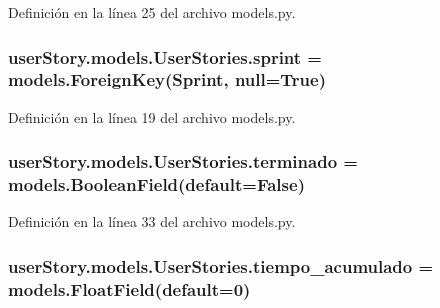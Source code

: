 Definición en la línea 25 del archivo models.\+py.

\subsubsection[{\texorpdfstring{sprint}{sprint}}]{\setlength{\rightskip}{0pt plus 5cm}user\+Story.\+models.\+User\+Stories.\+sprint = models.\+Foreign\+Key({\bf Sprint}, null=True)\hspace{0.3cm}{\ttfamily [static]}}\hypertarget{classuser_story_1_1models_1_1_user_stories_ab0c43b69bb58a9813846b1ea586a0789}{}\label{classuser_story_1_1models_1_1_user_stories_ab0c43b69bb58a9813846b1ea586a0789}


Definición en la línea 19 del archivo models.\+py.

\subsubsection[{\texorpdfstring{terminado}{terminado}}]{\setlength{\rightskip}{0pt plus 5cm}user\+Story.\+models.\+User\+Stories.\+terminado = models.\+Boolean\+Field(default=False)\hspace{0.3cm}{\ttfamily [static]}}\hypertarget{classuser_story_1_1models_1_1_user_stories_a89ef1d61ea0200dbdf1838bd2d10cc29}{}\label{classuser_story_1_1models_1_1_user_stories_a89ef1d61ea0200dbdf1838bd2d10cc29}


Definición en la línea 33 del archivo models.\+py.

\subsubsection[{\texorpdfstring{tiempo\+\_\+acumulado}{tiempo_acumulado}}]{\setlength{\rightskip}{0pt plus 5cm}user\+Story.\+models.\+User\+Stories.\+tiempo\+\_\+acumulado = models.\+Float\+Field(default=0)\hspace{0.3cm}{\ttfamily [static]}}\hypertarget{classuser_story_1_1models_1_1_user_stories_a2548818f576e0fd6fd91b3750d1fe1f4}{}\label{classuser_story_1_1models_1_1_user_stories_a2548818f576e0fd6fd91b3750d1fe1f4}


